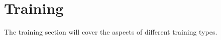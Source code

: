 \section{Training} \label{section::training}
The training section will cover the aspects of different training types.